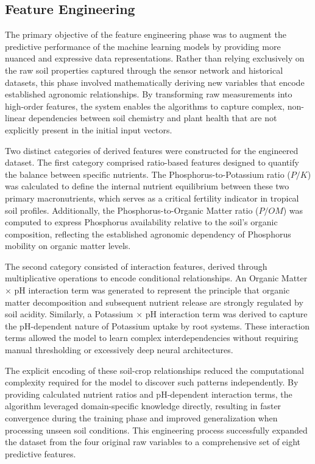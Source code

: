 {	\subsection{Feature Engineering}
	The primary objective of the feature engineering phase was to augment the predictive performance of the machine learning models by providing more nuanced and expressive data representations. Rather than relying exclusively on the raw soil properties captured through the sensor network and historical datasets, this phase involved mathematically deriving new variables that encode established agronomic relationships. By transforming raw measurements into high-order features, the system enables the algorithms to capture complex, non-linear dependencies between soil chemistry and plant health that are not explicitly present in the initial input vectors.
	
	Two distinct categories of derived features were constructed for the engineered dataset. The first category comprised ratio-based features designed to quantify the balance between specific nutrients. The Phosphorus-to-Potassium ratio ($P/K$) was calculated to define the internal nutrient equilibrium between these two primary macronutrients, which serves as a critical fertility indicator in tropical soil profiles. Additionally, the Phosphorus-to-Organic Matter ratio ($P/OM$) was computed to express Phosphorus availability relative to the soil's organic composition, reflecting the established agronomic dependency of Phosphorus mobility on organic matter levels.
	
	The second category consisted of interaction features, derived through multiplicative operations to encode conditional relationships. An Organic Matter $\times$ pH interaction term was generated to represent the principle that organic matter decomposition and subsequent nutrient release are strongly regulated by soil acidity. Similarly, a Potassium $\times$ pH interaction term was derived to capture the pH-dependent nature of Potassium uptake by root systems. These interaction terms allowed the model to learn complex interdependencies without requiring manual thresholding or excessively deep neural architectures.
	
	The explicit encoding of these soil-crop relationships reduced the computational complexity required for the model to discover such patterns independently. By providing calculated nutrient ratios and pH-dependent interaction terms, the algorithm leveraged domain-specific knowledge directly, resulting in faster convergence during the training phase and improved generalization when processing unseen soil conditions. This engineering process successfully expanded the dataset from the four original raw variables to a comprehensive set of eight predictive features.
	
}
